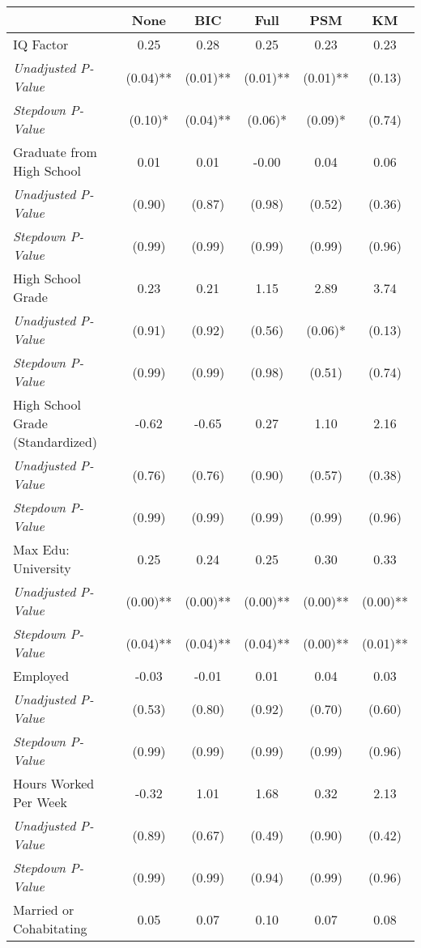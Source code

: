 \begin{tabular}{l c c c c c}
\toprule
 & None & BIC & Full & PSM & KM \\
\midrule
IQ Factor & 0.25 & 0.28 & 0.25 & 0.23 & 0.23 \\
\quad \textit{Unadjusted P-Value} & (0.04)** & (0.01)** & (0.01)** & (0.01)** & (0.13) \\
\quad \textit{Stepdown P-Value} & (0.10)* & (0.04)** & (0.06)* & (0.09)* & (0.74) \\
Graduate from High School & 0.01 & 0.01 & -0.00 & 0.04 & 0.06 \\
\quad \textit{Unadjusted P-Value} & (0.90) & (0.87) & (0.98) & (0.52) & (0.36) \\
\quad \textit{Stepdown P-Value} & (0.99) & (0.99) & (0.99) & (0.99) & (0.96) \\
High School Grade & 0.23 & 0.21 & 1.15 & 2.89 & 3.74 \\
\quad \textit{Unadjusted P-Value} & (0.91) & (0.92) & (0.56) & (0.06)* & (0.13) \\
\quad \textit{Stepdown P-Value} & (0.99) & (0.99) & (0.98) & (0.51) & (0.74) \\
High School Grade (Standardized) & -0.62 & -0.65 & 0.27 & 1.10 & 2.16 \\
\quad \textit{Unadjusted P-Value} & (0.76) & (0.76) & (0.90) & (0.57) & (0.38) \\
\quad \textit{Stepdown P-Value} & (0.99) & (0.99) & (0.99) & (0.99) & (0.96) \\
Max Edu: University & 0.25 & 0.24 & 0.25 & 0.30 & 0.33 \\
\quad \textit{Unadjusted P-Value} & (0.00)** & (0.00)** & (0.00)** & (0.00)** & (0.00)** \\
\quad \textit{Stepdown P-Value} & (0.04)** & (0.04)** & (0.04)** & (0.00)** & (0.01)** \\
Employed & -0.03 & -0.01 & 0.01 & 0.04 & 0.03 \\
\quad \textit{Unadjusted P-Value} & (0.53) & (0.80) & (0.92) & (0.70) & (0.60) \\
\quad \textit{Stepdown P-Value} & (0.99) & (0.99) & (0.99) & (0.99) & (0.96) \\
Hours Worked Per Week & -0.32 & 1.01 & 1.68 & 0.32 & 2.13 \\
\quad \textit{Unadjusted P-Value} & (0.89) & (0.67) & (0.49) & (0.90) & (0.42) \\
\quad \textit{Stepdown P-Value} & (0.99) & (0.99) & (0.94) & (0.99) & (0.96) \\
Married or Cohabitating & 0.05 & 0.07 & 0.10 & 0.07 & 0.08 \\

\end{tabular}
